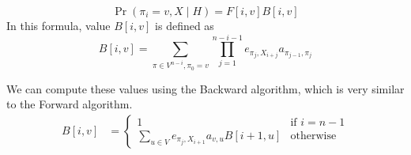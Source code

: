 \begin{equation}
\Pr\left(\pi_i=v,X\mid H\right) =  F[i,v]B[i, v]
\end{equation}
In this formula, value $B[i, v]$ is defined as 
\begin{equation}
B[i, v] =	
					\sum_{\pi\in V^{n-i},\pi_0=v}
					\prod_{j=1}^{n-i-1} e_{\pi_j,X_{i+j}}a_{\pi_{j-1},\pi_j}
\end{equation}

We can compute 
these values using  the Backward algorithm, which is very similar to the Forward
algorithm. 
\begin{align}
B[i,v]&=
\begin{cases}
1 & \textrm{if $i=n-1$}\\
 \sum_{u\in V}
 	e_{\pi_j,X_{i+1}}a_{v,u}B[i+1,u] & \textrm{otherwise}
\end{cases}
\end{align}

